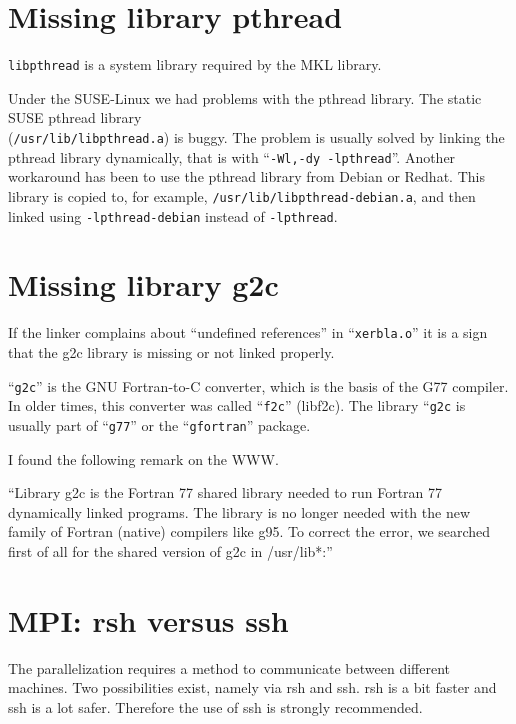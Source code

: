 \documentclass[a4paper,10pt]{report}
\newcommand{\mytt}[1]{{\tt #1}}
\begin{document}
\section{Missing library pthread}
\label{sec:problempthread}
\mytt{libpthread} is a system library required by the MKL library.

Under the SUSE-Linux we had problems with the pthread library.  The
static SUSE pthread library\\ (\mytt{/usr/lib/libpthread.a}) is
buggy. The problem is usually solved by linking the pthread library
dynamically, that is with ``\mytt{-Wl,-dy -lpthread}''.  Another
workaround has been to use the pthread library from Debian or Redhat.
This library is copied to, for example,
\mytt{/usr/lib/libpthread-debian.a}, and then linked using
\mytt{-lpthread-debian} instead of \mytt{-lpthread}.


\section{Missing library g2c}
\label{sec:problemg2c}
If the linker complains about ``undefined references'' in
``\mytt{xerbla.o}'' it is a sign that the g2c library is missing or
not linked properly.

``\mytt{g2c}'' is the GNU Fortran-to-C converter, which is the basis
of the G77 compiler. In older times, this converter was called
``\mytt{f2c}'' (libf2c). The library ``\mytt{g2c} is usually part of
``\mytt{g77}'' or the ``\mytt{gfortran}'' package.


I found the following remark on the WWW.

``Library g2c is the Fortran 77 shared library needed to run Fortran 77
dynamically linked programs. The library is no longer needed with the
new family of Fortran (native) compilers like g95.  To correct the
error, we searched first of all for the shared version of g2c in
/usr/lib*:''


\section{MPI: rsh versus ssh}
The parallelization requires a method to communicate between different
machines.  Two possibilities exist, namely via rsh and ssh. rsh is a
bit faster and ssh is a lot safer. Therefore the use of ssh is
strongly recommended.
\end{document}
